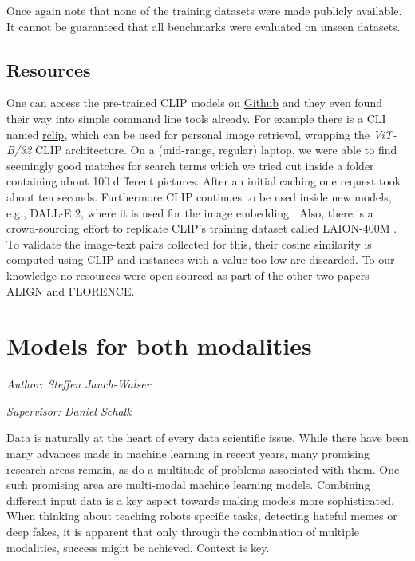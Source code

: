 \documentclass[
]{krantz}
\begin{document}
Once again note that none of the training datasets were made publicly available.
It cannot be guaranteed that all benchmarks were evaluated on unseen datasets.

\hypertarget{resources}{%
\subsection{Resources}\label{resources}}

One can access the pre-trained CLIP models on \href{https://github.com/openai/CLIP}{Github} and they even found their way into simple command line tools already.
For example there is a CLI named \href{https://github.com/yurijmikhalevich/rclip}{rclip}, which can be used for personal image retrieval, wrapping the \emph{ViT-B/32} CLIP architecture.
On a (mid-range, regular) laptop, we were able to find seemingly good matches for search terms which we tried out inside a folder containing about 100 different pictures.
After an initial caching one request took about ten seconds.
Furthermore CLIP continues to be used inside new models, e.g., DALL\(\cdot\)E 2, where it is used for the image embedding \citep{ramesh2022hierarchical}.
Also, there is a crowd-sourcing effort to replicate CLIP's training dataset called LAION-400M \citep{schuhmann2022laion}.
To validate the image-text pairs collected for this, their cosine similarity is computed using CLIP and instances with a value too low are discarded.
To our knowledge no resources were open-sourced as part of the other two papers ALIGN and FLORENCE.

\hypertarget{c02-05-text-plus-img}{%
\section{Models for both modalities}\label{c02-05-text-plus-img}}

\emph{Author: Steffen Jauch-Walser }

\emph{Supervisor: Daniel Schalk}

Data is naturally at the heart of every data scientific issue. While there have been many advances made in machine learning in recent years, many promising research areas remain, as do a multitude of problems associated with them. One such promising area are multi-modal machine learning models. Combining different input data is a key aspect towards making models more sophisticated. When thinking about teaching robots specific tasks, detecting hateful memes or deep fakes, it is apparent that only through the combination of multiple modalities, success might be achieved. Context is key.
\end{document}
